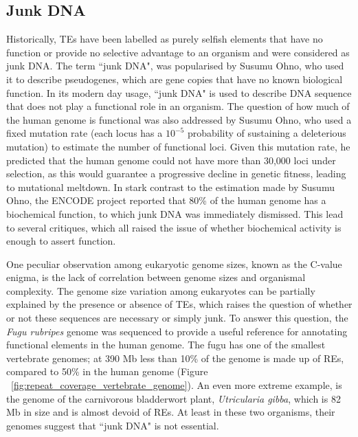 \subsection{Junk DNA}

Historically, TEs have been labelled as purely selfish elements that have no function or provide no selective advantage to an organism\cite{doolittle1980selfish, orgel1980selfish} and were considered as junk DNA. The term ``junk DNA", was popularised by Susumu Ohno\cite{pmid5065367}, who used it to describe pseudogenes, which are gene copies that have no known biological function. In its modern day usage, ``junk DNA" is used to describe DNA sequence that does not play a functional role in an organism. The question of how much of the human genome is functional was also addressed by Susumu Ohno, who used a fixed mutation rate (each locus has a $10^{-5}$ probability of sustaining a deleterious mutation) to estimate the number of functional loci\cite{pmid5065367}. Given this mutation rate, he predicted that the human genome could not have more than 30,000 loci under selection, as this would guarantee a progressive decline in genetic fitness, leading to mutational meltdown\cite{pmid24809441}. In stark contrast to the estimation made by Susumu Ohno, the ENCODE project reported that 80\% of the human genome has a biochemical function\cite{pmid22955616}, to which junk DNA was immediately dismissed\cite{Pennisi07092012}. This lead to several critiques\cite{pmid23431001, pmid23479647, Eddy2012}, which all raised the issue of whether biochemical activity is enough to assert function.

One peculiar observation among eukaryotic genome sizes, known as the C-value enigma, is the lack of correlation between genome sizes and organismal complexity\cite{pmid11325054}. The genome size variation among eukaryotes can be partially explained by the presence or absence of TEs\cite{pmid12188048}, which raises the question of whether or not these sequences are necessary or simply junk. To answer this question, the \textit{Fugu rubripes} genome was sequenced to provide a useful reference for annotating functional elements in the human genome\cite{pmid12142439}. The fugu has one of the smallest vertebrate genomes; at 390 Mb less than 10\% of the genome is made up of REs, compared to 50\% in the human genome (Figure ~\ref{fig:repeat_coverage_vertebrate_genome}). An even more extreme example, is the genome of the carnivorous bladderwort plant, \textit{Utricularia gibba}, which is 82 Mb in size and is almost devoid of REs\cite{pmid23665961}. At least in these two organisms, their genomes suggest that ``junk DNA" is not essential.

